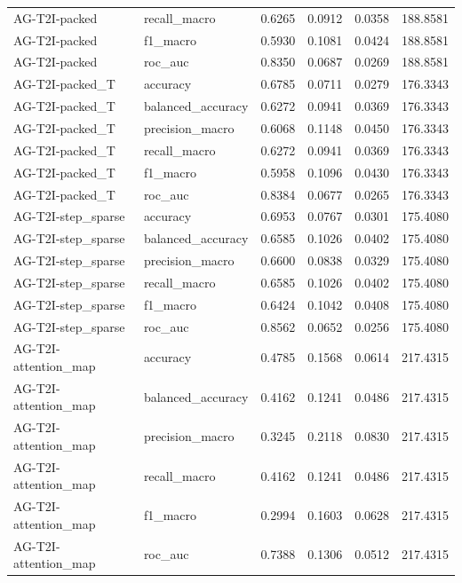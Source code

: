 \begin{tabular}{llrrrr}
AG-T2I-packed & recall_macro & 0.6265 & 0.0912 & 0.0358 & 188.8581 \\
AG-T2I-packed & f1_macro & 0.5930 & 0.1081 & 0.0424 & 188.8581 \\
AG-T2I-packed & roc_auc & 0.8350 & 0.0687 & 0.0269 & 188.8581 \\
AG-T2I-packed_T & accuracy & 0.6785 & 0.0711 & 0.0279 & 176.3343 \\
AG-T2I-packed_T & balanced_accuracy & 0.6272 & 0.0941 & 0.0369 & 176.3343 \\
AG-T2I-packed_T & precision_macro & 0.6068 & 0.1148 & 0.0450 & 176.3343 \\
AG-T2I-packed_T & recall_macro & 0.6272 & 0.0941 & 0.0369 & 176.3343 \\
AG-T2I-packed_T & f1_macro & 0.5958 & 0.1096 & 0.0430 & 176.3343 \\
AG-T2I-packed_T & roc_auc & 0.8384 & 0.0677 & 0.0265 & 176.3343 \\
AG-T2I-step_sparse & accuracy & 0.6953 & 0.0767 & 0.0301 & 175.4080 \\
AG-T2I-step_sparse & balanced_accuracy & 0.6585 & 0.1026 & 0.0402 & 175.4080 \\
AG-T2I-step_sparse & precision_macro & 0.6600 & 0.0838 & 0.0329 & 175.4080 \\
AG-T2I-step_sparse & recall_macro & 0.6585 & 0.1026 & 0.0402 & 175.4080 \\
AG-T2I-step_sparse & f1_macro & 0.6424 & 0.1042 & 0.0408 & 175.4080 \\
AG-T2I-step_sparse & roc_auc & 0.8562 & 0.0652 & 0.0256 & 175.4080 \\
AG-T2I-attention_map & accuracy & 0.4785 & 0.1568 & 0.0614 & 217.4315 \\
AG-T2I-attention_map & balanced_accuracy & 0.4162 & 0.1241 & 0.0486 & 217.4315 \\
AG-T2I-attention_map & precision_macro & 0.3245 & 0.2118 & 0.0830 & 217.4315 \\
AG-T2I-attention_map & recall_macro & 0.4162 & 0.1241 & 0.0486 & 217.4315 \\
AG-T2I-attention_map & f1_macro & 0.2994 & 0.1603 & 0.0628 & 217.4315 \\
AG-T2I-attention_map & roc_auc & 0.7388 & 0.1306 & 0.0512 & 217.4315 \\
\bottomrule
\end{tabular}
